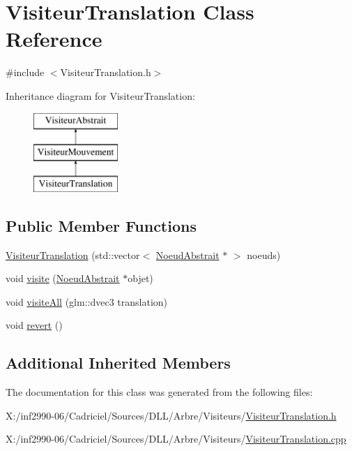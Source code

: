 \hypertarget{class_visiteur_translation}{\section{Visiteur\-Translation Class Reference}
\label{class_visiteur_translation}
}


{\ttfamily \#include $<$Visiteur\-Translation.\-h$>$}

Inheritance diagram for Visiteur\-Translation\-:\begin{figure}[H]
\begin{center}
\leavevmode
\includegraphics[height=3.000000cm]{class_visiteur_translation}
\end{center}
\end{figure}
\subsection*{Public Member Functions}
\begin{DoxyCompactItemize}
\item 
\hyperlink{group__inf2990_ga909fd9d07ccdf592eb49ecab6efe35c2}{Visiteur\-Translation} (std\-::vector$<$ \hyperlink{class_noeud_abstrait}{Noeud\-Abstrait} $\ast$ $>$ noeuds)
\item 
void \hyperlink{group__inf2990_ga37d443ac64c0aece4a557a7f9ba38fa1}{visite} (\hyperlink{class_noeud_abstrait}{Noeud\-Abstrait} $\ast$objet)
\item 
void \hyperlink{group__inf2990_gaed8ad4b7cff9d2f450879ba5786c64c5}{visite\-All} (glm\-::dvec3 translation)
\item 
void \hyperlink{group__inf2990_gad61ada623611fdf4e6c613f1226d2e6d}{revert} ()
\end{DoxyCompactItemize}
\subsection*{Additional Inherited Members}


The documentation for this class was generated from the following files\-:\begin{DoxyCompactItemize}
\item 
X\-:/inf2990-\/06/\-Cadriciel/\-Sources/\-D\-L\-L/\-Arbre/\-Visiteurs/\hyperlink{_visiteur_translation_8h}{Visiteur\-Translation.\-h}\item 
X\-:/inf2990-\/06/\-Cadriciel/\-Sources/\-D\-L\-L/\-Arbre/\-Visiteurs/\hyperlink{_visiteur_translation_8cpp}{Visiteur\-Translation.\-cpp}\end{DoxyCompactItemize}
